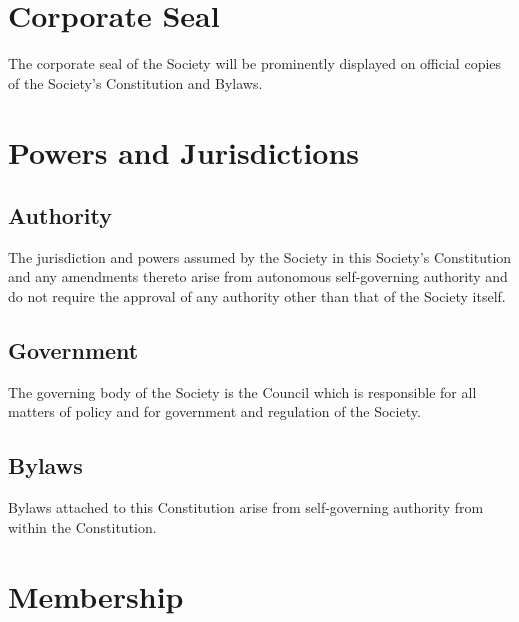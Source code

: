 \newpage
\section{Corporate Seal}
The corporate seal of the Society will be prominently displayed on official copies of the Society's Constitution and Bylaws.

\newpage
\section{Powers and Jurisdictions}
\subsection{Authority}
The jurisdiction and powers assumed by the Society in this Society's Constitution and any amendments thereto arise from autonomous self-governing authority and do not require the approval of any authority other than that of the Society itself. 
\subsection{Government}
The governing body of the Society is the Council which is responsible for all matters of policy and for government and regulation of the Society. 
\subsection{Bylaws}
Bylaws attached to this Constitution arise from self-governing authority from within the Constitution.
\newpage

\section{Membership}

